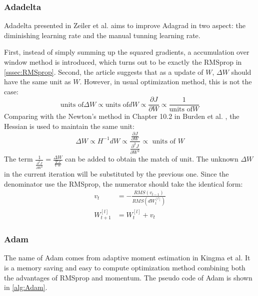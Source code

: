\subsubsection{Adadelta}
Adadelta presented in Zeiler et al. \parencite{zeiler2012adadelta} aims to improve
Adagrad in two aspect: the diminishing learning rate and the manual tunning 
learning rate.
\par First, instead of simply summing up the squared gradients, a accumulation
over window method is introduced, which turns out to be exactly the RMSprop
in \autoref{sssec:RMSprop}. Second, the article suggests that as a 
update of $ W $, $ \Delta W $ should have the same unit as $ W $. However, in usual
optimization method, this is not the case:
\begin{equation}
    \text{units of}\Delta W \propto \text{units of} dW \propto \frac{\partial J}{\partial W} \propto \frac{1}{\text{units of}W}
\end{equation}  
Comparing with the Newton's method in Chapter 10.2 in Burden et al. 
\parencite{burden2010numerical}, the Hessian is used to maintain the same unit:
\begin{equation}
    \Delta W \propto H^{-1} dW \propto \frac{\frac{\partial J}{\partial W}}{\frac{\partial^{2} J}{\partial W^{2}}} \propto \text { units of } W
\end{equation}
The term $ \frac{1}{\frac{\partial^{2} J}{\partial W^{2}}} = \frac{\Delta W}{\frac{\nabla J}{\nabla W}} $
can be added to obtain the match of unit. The unknown $ \Delta W $ in the current iteration
will be substituted by the previous one. Since the denominator use the RMSprop,
the numerator should take the identical form:
\begin{equation}
    \begin{split}
        v_t & = -\frac{RMS(v_{t-1})}{RMS(dW_t^{[l]})} \\
        W_{t+1}^{[l]} & = W_{t}^{[l]} + v_t 
    \end{split}
\end{equation}

\subsubsection{Adam}
The name of Adam comes from adaptive moment estimation in Kingma et al. \parencite{kingma2014adam}
It is a memory saving and easy to compute optimization method combining 
both the advantages of RMSprop and momentum. The pseudo code of Adam is 
shown in \autoref{alg:Adam}.

